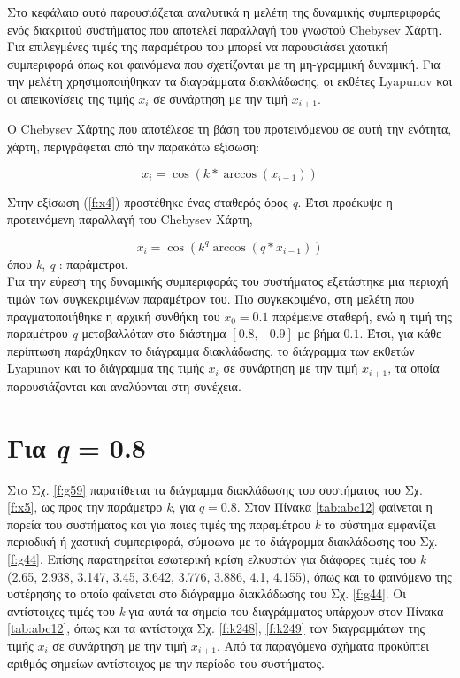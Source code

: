 Στο κεφάλαιο αυτό παρουσιάζεται αναλυτικά η μελέτη της δυναμικής συμπεριφοράς ενός διακριτού συστήματος που αποτελεί παραλλαγή του γνωστού Chebysev Χάρτη. Για επιλεγμένες τιμές της παραμέτρου του μπορεί να παρουσιάσει χαοτική συμπεριφορά όπως και φαινόμενα που σχετίζονται με τη μη-γραμμική δυναμική. Για την μελέτη χρησιμοποιήθηκαν τα διαγράμματα διακλάδωσης, οι εκθέτες Lyapunov και οι απεικονίσεις της τιμής \(x_i\) σε συνάρτηση με  την τιμή \(x_{i+1}\).

Ο Chebysev Χάρτης που αποτέλεσε τη βάση του προτεινόμενου σε αυτή την ενότητα, χάρτη, περιγράφεται από την παρακάτω εξίσωση:

\begin{equation}
	x_i=\cos(k*\arccos(x_{i-1}))
	\label{f:x4}
\end{equation}


Στην εξίσωση (\ref{f:x4}) προστέθηκε ένας σταθερός όρος \emph{q}. Έτσι προέκυψε η προτεινόμενη παραλλαγή του Chebysev Χάρτη,

\begin{equation}
	x_i=\cos(k^q\arccos(q*x_{i-1}))
	\label{f:x5}
\end{equation}
όπου \emph{k}, \emph{q} : παράμετροι.\\

Για την εύρεση της δυναμικής συμπεριφοράς του συστήματος εξετάστηκε μια περιοχή τιμών των συγκεκριμένων παραμέτρων του. Πιο συγκεκριμένα, στη μελέτη που πραγματοποιήθηκε η αρχική συνθήκη του $x_0 =0.1$ παρέμεινε  σταθερή, ενώ η τιμή της παραμέτρου \emph{q} μεταβαλλόταν στο διάστημα $[0.8,-0.9]$ με βήμα $0.1$. Έτσι, για κάθε περίπτωση παράχθηκαν το διάγραμμα διακλάδωσης, το διάγραμμα των εκθετών Lyapunov και το διάγραμμα της τιμής \(x_i\) σε συνάρτηση με  την τιμή \(x_{i+1}\), τα οποία παρουσιάζονται και αναλύονται στη συνέχεια.\\

\vspace{\fill}


\section{Για \emph{q} = 0.8}

Στo Σχ. \ref{f:g59} παρατίθεται τα διάγραμμα διακλάδωσης του συστήματος του Σχ. \ref{f:x5}, ως προς την παράμετρο \emph{k}, για $q =0.8$. Στον Πίνακα \ref{tab:abc12} φαίνεται η πορεία του συστήματος και για ποιες τιμές της παραμέτρου \emph{k} το σύστημα εμφανίζει περιοδική ή χαοτική συμπεριφορά, σύμφωνα με το διάγραμμα διακλάδωσης του Σχ. \ref{f:g44}. Επίσης παρατηρείται εσωτερική κρίση ελκυστών για διάφορες τιμές του \emph{k} (2.65, 2.938, 3.147, 3.45, 3.642, 3.776, 3.886, 4.1, 4.155), όπως και το φαινόμενο της υστέρησης το οποίο φαίνεται στο διάγραμμα διακλάδωσης του Σχ. \ref{f:g44}. Οι αντίστοιχες τιμές του \emph{k} για αυτά τα σημεία του διαγράμματος υπάρχουν στον Πίνακα \ref{tab:abc12}, όπως και τα αντίστοιχα Σχ. \ref{f:k248}, \ref{f:k249} των διαγραμμάτων της τιμής \(x_i\) σε συνάρτηση με την τιμή \(x_{i+1}\). Από τα παραγόμενα σχήματα προκύπτει αριθμός σημείων αντίστοιχος με την περίοδο του συστήματος.

